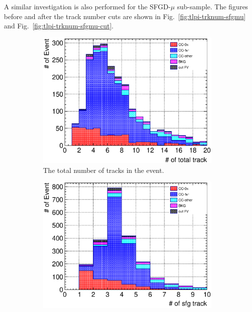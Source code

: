 A similar investigation is also performed for the SFGD-$\mu$ sub-sample.
The figures before and after the track number cuts are shown in Fig.~\ref{fig:tlpi-trknum-sfgmu} and Fig.~\ref{fig:tlpi-trknum-sfgmu-cut}.
\begin{figure}
  \centering
  \begin{subfigure}{\dbfigwid\textwidth}
       \includegraphics[width=\textwidth]{figures/sel/SFGmu_ntotaltrk_stack_al8.eps}
       \caption{The total number of tracks in the event.}
       \label{subfig:tlpi-trknum-tot-sfgmu}
  \end{subfigure}
  \begin{subfigure}{\dbfigwid\textwidth}
       \includegraphics[width=\textwidth]{figures/sel/SFGmu_nsfgtrk_stack_al8.eps}

\end{subfigure}
\end{figure}
